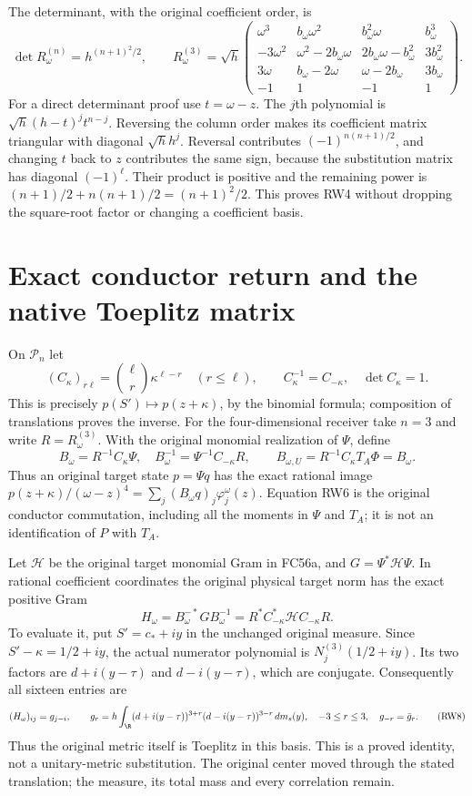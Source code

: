 The determinant, with the original coefficient order, is
\[
 \det R_\omega^{(n)}=h^{(n+1)^2/2},\qquad
 R_\omega^{(3)}=\sqrt h
 \begin{pmatrix}
 \omega^3&b_\omega\omega^2&b_\omega^2\omega&b_\omega^3\\
 -3\omega^2&\omega^2-2b_\omega\omega&2b_\omega\omega-b_\omega^2&3b_\omega^2\\
 3\omega&b_\omega-2\omega&\omega-2b_\omega&3b_\omega\\
 -1&1&-1&1
 \end{pmatrix}.
 \tag{RW4}
\]
For a direct determinant proof use $t=\omega-z$. The $j$th
polynomial is $\sqrt h(h-t)^jt^{n-j}$. Reversing the column
order makes its coefficient matrix triangular with diagonal
$\sqrt h h^j$. Reversal contributes
$(-1)^{n(n+1)/2}$, and changing $t$ back to $z$ contributes the
same sign, because the substitution matrix has diagonal $(-1)^\ell$.
Their product is positive and the remaining power is
$(n+1)/2+n(n+1)/2=(n+1)^2/2$. This proves RW4 without dropping
the square-root factor or changing a coefficient basis.

\section{Exact conductor return and the native Toeplitz matrix}
On $\mathcal P_n$ let
\[
 (C_\kappa)_{r\ell}=\binom\ell r\kappa^{\ell-r}\quad(r\le\ell),
 \qquad C_\kappa^{-1}=C_{-\kappa},\quad\det C_\kappa=1.
 \tag{RW5}
\]
This is precisely $p(S')\mapsto p(z+\kappa)$, by the binomial
formula; composition of translations proves the inverse.
For the four-dimensional receiver take $n=3$ and write $R=R_\omega^{(3)}$.
With the original monomial realization of $\Psi$, define
\[
 B_\omega=R^{-1}C_\kappa\Psi,\quad
 B_\omega^{-1}=\Psi^{-1}C_{-\kappa}R,\qquad
 B_{\omega,U}=R^{-1}C_\kappa T_A\Phi=B_\omega.
 \tag{RW6}
\]
Thus an original target state $p=\Psi q$ has the exact rational
image $p(z+\kappa)/(\omega-z)^4=\sum_j(B_\omega q)_j\varphi_j^\omega(z)$.
Equation RW6 is the original conductor commutation, including
all the moments in $\Psi$ and $T_A$; it is not an identification
of $P$ with $T_A$.

Let $\mathcal H$ be the original target monomial Gram in FC56a,
and $G=\Psi^*\mathcal H\Psi$. In rational coefficient coordinates
the original physical target norm has the exact positive Gram
\[
 H_\omega=B_\omega^{-*}GB_\omega^{-1}
       =R^*C_{-\kappa}^*\mathcal HC_{-\kappa}R.
 \tag{RW7}
\]
To evaluate it, put $S'=c_*+iy$ in the unchanged original
measure. Since $S'-\kappa=1/2+iy$, the actual numerator
polynomial is $N_j^{(3)}(1/2+iy)$. Its two factors are
$d+i(y-\tau)$ and $d-i(y-\tau)$, which are conjugate.
Consequently all sixteen entries are
\[
 (H_\omega)_{ij}=g_{j-i},\qquad
 g_r=h\int_{\R}(d+i(y-\tau))^{3+r}
                    (d-i(y-\tau))^{3-r}\,dm_s(y),
 \quad -3\le r\le3,\quad g_{-r}=\bar g_r.
 \tag{RW8}
\]
Thus the original metric itself is Toeplitz in this basis.
This is a proved identity, not a unitary-metric substitution.
The original center moved through the stated translation;
the measure, its total mass and every correlation remain.

